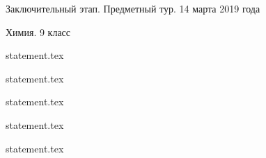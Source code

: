 \documentclass[a4paper,11pt, oneside]{book}
\begin{document}
\vspace{-3mm}
\vspace{-5mm}

\normalsize

\begin{center}
    Заключительный этап. Предметный тур. 14 марта 2019 года
    
    Химия. 9 класс
\end{center}

\parindent=0cm

{statement.tex}

{statement.tex}

{statement.tex}

{statement.tex}

{statement.tex}
\end{document}
